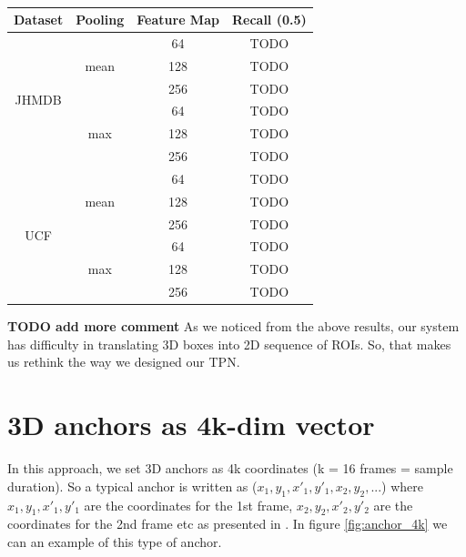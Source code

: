 \documentclass{report}
\begin{document}
\begin{table}[h]
  \centering
  \begin{tabular}{||c | c | c || c||}
    \textbf{Dataset} & \textbf{Pooling} & \textbf{Feature Map} & \textbf{Recall (0.5)} \\
    \hline
    \multirow{6}{*}{JHMDB} & \multirow{3}{*}{mean} & 64 & TODO \\
    \cline{3-4}
    {} & {} & 128 & TODO \\
    \cline{3-4}
    {} & {} & 256 & TODO \\
    \cline{2-4}
    {} & \multirow{3}{*}{max} & 64 & TODO \\
    \cline{3-4}
    {} & {} & 128 & TODO \\
    \cline{3-4}
    {} & {} & 256 & TODO \\
    \hline
    \multirow{6}{*}{UCF} & \multirow{3}{*}{mean} & 64 & TODO \\
    \cline{3-4}
    {} & {} & 128 & TODO \\
    \cline{3-4}
    {} & {} & 256 & TODO \\
    \cline{2-4}
    {} & \multirow{3}{*}{max} & 64 & TODO \\
    \cline{3-4}
    {} & {} & 128 & TODO \\
    \cline{3-4}
    {} & {} & 256 & TODO \\
    \hline


  \end{tabular}
  \caption{}
  \label{table:reg_1_2}
\end{table}

\textbf{TODO add more comment}
As we noticed from the above results, our system has difficulty in translating 3D boxes into 2D sequence of ROIs. So, that makes us rethink the way we designed
our TPN.

\section{ 3D anchors as 4k-dim vector}
In this approach, we set 3D anchors as 4k coordinates (k = 16 frames = sample duration). So a typical anchor is written as ($x_1, y_1, x'_1, y'_1, x_2, y_2, ...$)
where $x_1, y_1, x'_1, y'_1 $ are the coordinates for the 1st frame, $x_2, y_2, x'_2, y'_2$ are the coordinates for the 2nd frame etc as presented in \cite{DBLP:journals/corr/abs-1712-09184}.
In figure \ref{fig:anchor_4k} we can an example of this type of anchor.
\end{document}
